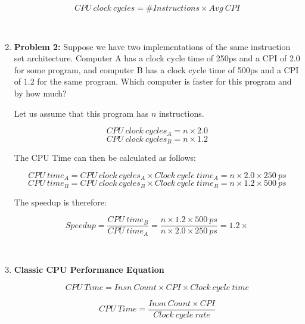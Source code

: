 \documentclass[12pt]{article}
\begin{document}
\begin{enumerate}
    \begin{equation*}
        CPU\ clock\ cycles = \# Instructions \times Avg\ CPI
    \end{equation*}
    
    \ 
    
    \item \textbf{Problem 2:} Suppose we have two implementations of the same instruction set architecture. Computer A has a clock cycle time of 250ps and a CPI of 2.0 for some program, and computer B has a clock cycle time of 500ps and a CPI of 1.2 for the same program. Which computer is faster for this program and by how much?
    
    Let us assume that this program has $n$ instructions.
    
    \begin{equation*}
        CPU\ clock\ cycles_{A} = n \times 2.0
    \end{equation*}
    \begin{equation*}
        CPU\ clock\ cycles_{B} = n \times 1.2
    \end{equation*}
    
    The CPU Time can then be calculated as follows:
    
    \begin{equation*}
        CPU\ time_{A} = CPU\ clock\ cycles_{A} \times Clock\ cycle\ time_{A} = n \times 2.0 \times 250\ ps
    \end{equation*}
    \begin{equation*}
        CPU\ time_{B} = CPU\ clock\ cycles_{B} \times Clock\ cycle\ time_{B} = n \times 1.2 \times 500\ ps
    \end{equation*}    
    
    The speedup is therefore:
    
    \begin{equation*}
        Speedup = \frac{CPU\ time_{B}}{CPU\ time_{A}} = \frac{n \times 1.2 \times 500\ ps}{n \times 2.0 \times 250\ ps} = 1.2 \times 
    \end{equation*}
    
    \ 
    
    \item \textbf{Classic CPU Performance Equation}
    
    \begin{equation}
        CPU\ Time = Insn\ Count \times CPI \times Clock\ cycle\ time
    \end{equation}
    
    \begin{equation}
        CPU\ Time = \frac{Insn\ Count \times CPI}{Clock\ cycle\ rate}
    \end{equation}
    
\end{enumerate}
\end{document}
